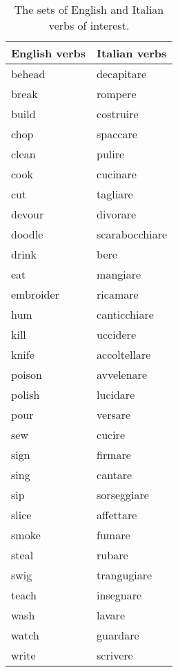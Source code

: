\begin{table}[htb] %
\caption{The sets of English and Italian verbs of interest.}
\begin{tabular}{ll}
English verbs & Italian verbs \\
\hline
behead	&	decapitare	\\
break	&	rompere	\\
build	&	costruire\\	
chop	&	spaccare	\\
clean	&	pulire	\\
cook	&	cucinare	\\
cut	&	tagliare	\\
devour	&	divorare	\\
doodle	&	scarabocchiare\\	
drink	&	bere	\\
eat	&	mangiare	\\
embroider	&	ricamare	\\
hum	&	canticchiare	\\
kill	&	uccidere	\\
knife	&	accoltellare	\\
poison	&	avvelenare	\\
polish	&	lucidare	\\
pour	&	versare	\\
sew	&	cucire	\\
sign	&	firmare	\\
sing	&	cantare	\\
sip	&	sorseggiare	\\
slice	&	affettare\\	
smoke	&	fumare	\\
steal	&	rubare	\\
swig	&	trangugiare	\\
teach	&	insegnare	\\
wash	&	lavare	\\
watch	&	guardare	\\
write	&	scrivere	       
\end{tabular}
\end{table}

